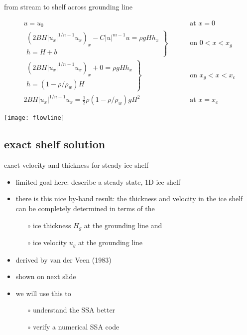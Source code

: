 \begin{frame}{from stream to shelf across grounding line}
\label{slide:streamtoshelf}

\begin{align*}
  u = u_0 & \qquad \text{ at } x = 0 \\
  \left.\begin{array}{r}
  \left(2 B H |u_x|^{1/n - 1} u_x\right)_x - C|u|^{m-1}u = \rho g H h_x \\
  h = H + b
  \end{array}\right\}& \qquad \text{ on } 0 < x < x_g \\
  \left.\begin{array}{r}
  \left(2 B H |u_x|^{1/n - 1} u_x\right)_x + 0 = \rho g H h_x \\
  h = (1-\rho/\rho_w) H
  \end{array}\right\}& \qquad \text{ on } x_g < x < x_c \\
  2 B H |u_x|^{1/n - 1} u_x = \frac{1}{2}\rho (1-\rho/\rho_w) g H^2 & \qquad \text{ at } x = x_c
\end{align*}

\bigskip
\begin{center}
  \texttt{[image: flowline]}
\end{center}
\end{frame}


\subsection{exact shelf solution}

\begin{frame}{exact velocity and thickness for steady ice shelf}

\begin{itemize}
\item limited goal here: describe a steady state, 1D ice shelf
\item there is this nice \alert{by-hand} result: the thickness and velocity in the ice shelf can be completely determined in terms of the 
  \begin{itemize}
  \item[$\circ$] ice thickness $H_g$ at the grounding line and
  \item[$\circ$] ice velocity $u_g$ at the grounding line
  \end{itemize}
\item derived by van der Veen (1983)
\item shown on next slide
\item we will use this to
  \begin{itemize}
  \item[$\circ$] understand the SSA better
  \item[$\circ$] verify a numerical SSA code
  \end{itemize}
\end{itemize}
\end{frame}


